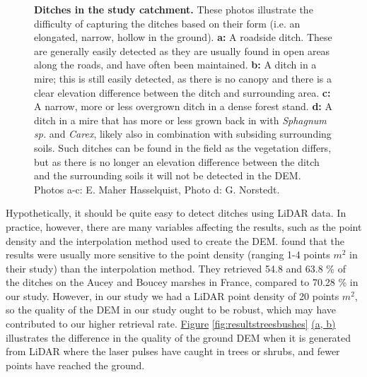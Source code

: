 \documentclass[11pt, review]{elsarticle} %
\begin{document}
\begin{figure} [!htb]
    \caption{\textbf{Ditches in the study catchment.} These photos illustrate the difficulty of capturing the ditches based on their form (i.e. an elongated, narrow, hollow in the ground). \textbf{a: }A roadside ditch. These are generally easily detected as they are usually found in open areas along the roads, and have often been maintained. \textbf{b: }A ditch in a mire; this is still easily detected, as there is no canopy and there is a clear elevation difference between the ditch and surrounding area. \textbf{c: }A narrow, more or less  overgrown ditch in a dense forest stand. \textbf{d: }A ditch in a mire that has more or less grown back in with \textit{Sphagnum sp.} and \textit{Carex}, likely also in combination with subsiding surrounding soils. Such ditches can be found in the field as the vegetation differs, but as there is no longer an elevation difference between the ditch and the surrounding soils it will not be detected in the DEM. \newline Photos a-c: E. Maher Hasselquist, Photo d: G. Norstedt.}
    \label{fig:ditchpictures}
\end{figure}

Hypothetically, it should be quite easy to detect ditches using LiDAR data. In practice, however, there are many variables affecting the results, such as the point density and the interpolation method used to create the DEM. \citet{rapinel} found that the results were usually more sensitive to the point density (ranging 1-4 points $m^{2}$ in their study) than the interpolation method. They retrieved 54.8 and 63.8 \% of the ditches on the Aucey and Boucey marshes in France, compared to 70.28 \% in our study. However, in our study we had a LiDAR point density of 20 points $m^{2}$, so the quality of the DEM in our study ought to be robust, which may have contributed to our higher retrieval rate. \hyperref[fig:resultstreesbushes]{Figure} \ref{fig:resultstreesbushes} \hyperref[fig:resultstreesbushes]{(a, b)} illustrates the difference in the quality of the ground DEM when it is generated from LiDAR where the laser pulses have caught in trees or shrubs, and fewer points have reached the ground.
\end{document}
